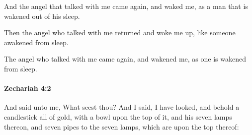 			\begin{versebox}
					\item[BHS] 
					\item[LXX] 
					\item[ASV] And the angel that talked with me came again, and waked me, as a man that is wakened out of his sleep.
					\item[NIV] Then the angel who talked with me returned and woke me up, like someone awakened from sleep.
					\item[NRSV] The angel who talked with me came again, and wakened me, as one is wakened from sleep.
			\end{versebox}

		\paragraph{Zechariah 4:2} %
			\label{ZECHARIAH-4-2}

			And said unto me, What seest thou? And I said, I have looked, and behold a candlestick all of gold, with a bowl upon the top of it, and his seven lamps thereon, and seven pipes to the seven lamps, which are upon the top thereof:

